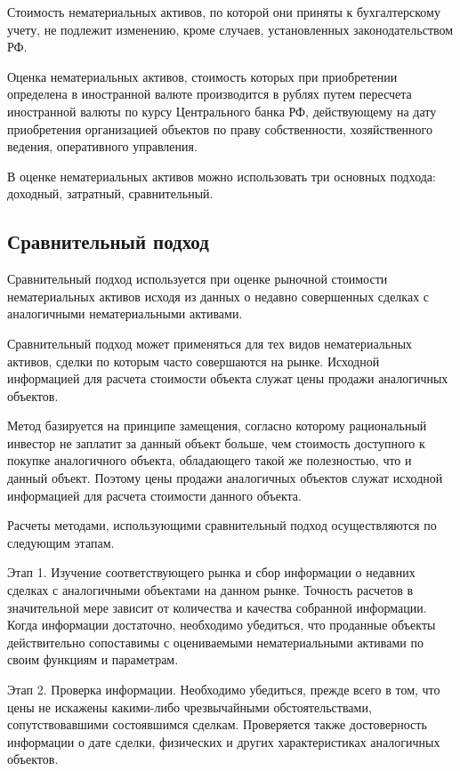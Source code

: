 Стоимость нематериальных активов, по которой они приняты к бухгалтерскому учету, не подлежит изменению, кроме случаев, установленных законодательством РФ.

Оценка нематериальных активов, стоимость которых при приобретении определена в иностранной валюте производится в рублях путем пересчета иностранной валюты по курсу Центрального банка РФ, действующему на дату приобретения организацией объектов по праву собственности, хозяйственного ведения, оперативного управления.

В оценке нематериальных активов можно использовать три основных подхода: доходный, затратный, сравнительный.

\subsection{Сравнительный подход}

Сравнительный подход используется при оценке рыночной стоимости нематериальных активов исходя из данных о недавно совершенных сделках с аналогичными нематериальными активами. 

Сравнительный подход может применяться для тех видов нематериальных активов, сделки по которым часто совершаются на рынке. Исходной информацией для расчета стоимости объекта служат цены продажи аналогичных объектов.

Метод базируется на принципе замещения, согласно которому рациональный инвестор не заплатит за данный объект больше, чем стоимость доступного к покупке аналогичного объекта, обладающего такой же полезностью, что и данный объект. Поэтому цены продажи аналогичных объектов служат исходной информацией для расчета стоимости данного объекта.

Расчеты методами, использующими сравнительный подход осуществляются по следующим этапам.

Этап 1. Изучение соответствующего рынка и сбор информации о недавних сделках с аналогичными объектами на данном рынке. Точность расчетов в значительной мере зависит от количества и качества собранной информации. Когда информации достаточно, необходимо убедиться, что проданные объекты действительно сопоставимы с оцениваемыми нематериальными активами по своим функциям и параметрам.

Этап 2. Проверка информации. Необходимо убедиться, прежде всего в том, что цены не искажены какими-либо чрезвычайными обстоятельствами, сопутствовавшими состоявшимся сделкам. Проверяется также достоверность информации о дате сделки, физических и других характеристиках аналогичных объектов.

